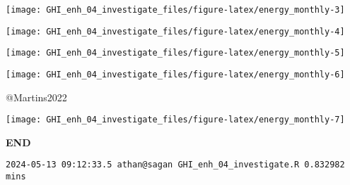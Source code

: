 \documentclass[
  10pt,
  a4paper,oneside]{article}
\begin{document}
\begin{center}\texttt{[image: GHI\_enh\_04\_investigate\_files/figure-latex/energy\_monthly-3]} \end{center}

\begin{center}\texttt{[image: GHI\_enh\_04\_investigate\_files/figure-latex/energy\_monthly-4]} \end{center}

\begin{center}\texttt{[image: GHI\_enh\_04\_investigate\_files/figure-latex/energy\_monthly-5]} \end{center}

\begin{center}\texttt{[image: GHI\_enh\_04\_investigate\_files/figure-latex/energy\_monthly-6]} \end{center}

@Martins2022

\begin{center}\texttt{[image: GHI\_enh\_04\_investigate\_files/figure-latex/energy\_monthly-7]} \end{center}

\textbf{END}

\begin{verbatim}
2024-05-13 09:12:33.5 athan@sagan GHI_enh_04_investigate.R 0.832982 mins
\end{verbatim}
\end{document}
